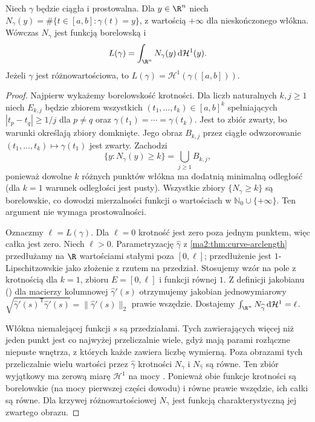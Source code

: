 \begin{twierdzenie}
\label{ma2:thm:curve-length-multiplicity}
Niech $\gamma$ będzie ciągła i prostowalna.
Dla $y\in\R^n$ niech
$N_\gamma(y)=\#\{t\in[a,b]:\gamma(t)=y\}$,
z wartością $+\infty$ dla nieskończonego włókna.
Wówczas $N_\gamma$ jest funkcją borelowską i
\[
 L(\gamma)=\int_{\R^n}N_\gamma(y)\,\mathrm d\mathcal H^1(y).
\]
Jeżeli $\gamma$ jest różnowartościowa, to
$L(\gamma)=\mathcal H^1(\gamma([a,b]))$.
\end{twierdzenie}
\begin{proof}
Najpierw wykażemy borelowskość krotności. Dla
liczb naturalnych $k,j\ge1$ niech $E_{k,j}$
będzie zbiorem wszystkich $(t_1,\ldots,t_k)\in[a,b]^k$
spełniających $|t_p-t_q|\ge1/j$ dla $p\ne q$
oraz $\gamma(t_1)=\cdots=\gamma(t_k)$.
Jest to zbiór zwarty, bo warunki określają
zbiory domknięte. Jego obraz $B_{k,j}$ przez
ciągłe odwzorowanie $(t_1,\ldots,t_k)\mapsto\gamma(t_1)$
jest zwarty. Zachodzi
\[
 \{y:N_\gamma(y)\ge k\}=\bigcup_{j\ge1}B_{k,j},
\]
ponieważ dowolne $k$ różnych punktów włókna
ma dodatnią minimalną odległość (dla $k=1$
warunek odległości jest pusty). Wszystkie zbiory
$\{N_\gamma\ge k\}$ są borelowskie, co dowodzi
mierzalności funkcji o wartościach w
$\mathbb N_0\cup\{+\infty\}$.
Ten argument nie wymaga prostowalności.

Oznaczmy $\ell=L(\gamma)$.
Dla $\ell=0$ krotność jest zero poza jednym
punktem, więc całka jest zero.
Niech $\ell>0$. Parametryzację $\widehat\gamma$
z \ref{ma2:thm:curve-arclength} przedłużamy na
$\R$ wartościami stałymi poza $[0,\ell]$;
przedłużenie jest $1$-Lipschitzowskie jako
złożenie z rzutem na przedział.
Stosujemy wzór na pole z krotnością
dla $k=1$, zbioru $E=[0,\ell]$ i funkcji równej $1$.
Z definicji jakobianu
()
dla macierzy kolumnowej $\widehat\gamma'(s)$
otrzymujemy jakobian jednowymiarowy
$\sqrt{\widehat\gamma'(s)^{\mathsf T}\widehat\gamma'(s)}
=\|\widehat\gamma'(s)\|_2$ prawie wszędzie.
Dostajemy
$\int_{\R^n}N_{\widehat\gamma}\,\mathrm d\mathcal H^1=\ell$.

Włókna niemalejącej funkcji $s$ są przedziałami.
Tych zawierających więcej niż jeden punkt
jest co najwyżej przeliczalnie wiele, gdyż
mają parami rozłączne niepuste wnętrza,
z których każde zawiera liczbę wymierną.
Poza obrazami tych przeliczalnie wielu wartości
przez $\widehat\gamma$ krotności
$N_\gamma$ i $N_{\widehat\gamma}$ są równe.
Ten zbiór wyjątkowy ma zerową miarę $\mathcal H^1$
na mocy
.
Ponieważ obie funkcje krotności są borelowskie
(na mocy pierwszej części dowodu) i równe prawie
wszędzie, ich całki są równe.
Dla krzywej różnowartościowej $N_\gamma$ jest
funkcją charakterystyczną jej zwartego obrazu.
\end{proof}

